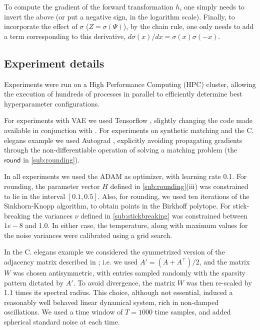 \documentclass[twoside]{article}
\begin{document}
To compute the gradient of the forward transformation $h$, one simply needs to invert the above (or put a negative sign, in the logarithm scale). Finally,  to incorporate the effect of $\sigma$ ($Z=\sigma(\Psi)$), by the chain rule,  one only needs to add a term corresponding to this derivative, $d\sigma(x)/dx=\sigma(x)\sigma(-x)$. 
\subsection*{Experiment details}

Experiments were run on a High Performance Computing (HPC) cluster, allowing the execution of hundreds of processes in parallel to efficiently determine best hyperparameter configurations.

For experiments with VAE we used Tensorflow \citep{Abadi2016}, slightly changing the code made available in conjunction with \cite{jang2016categorical}. For experiments on synthetic matching and the C. elegans example we used Autograd  \citep{maclaurin2015autograd}, explicitly avoiding propagating gradients through the non-differentiable operation of solving a matching problem (the $\mathsf{round}$ in \ref{sub:rounding}).

In all experiments we used the ADAM as optimizer, with learning rate 0.1. For rounding, the parameter vector $H$ defined in \ref{sub:rounding}(iii) was constrained to lie in the interval $[0.1, 0.5]$. Also, for rounding, we used ten iterations of the Sinkhorn-Knopp algorithm, to obtain points in the Birkhoff polytope. For stick-breaking the variances $\nu$ defined in \ref{sub:stickbreaking} was constrained between $1e-8$ and 1.0. In either case, the temperature, along with maximum values for the noise variances were calibrated using a grid search.
 
In the C. elegans example we considered the symmetrized version of the adjacency matrix described in \citep{varshney2011structural}; i.e. we used $A'=(A+A^\top)/2$, and the matrix $W$ was chosen antisymmetric, with entries sampled randomly with the sparsity pattern dictated by $A'$. To avoid divergence, the matrix $W$ was then re-scaled by 1.1 times its spectral radius. This choice, although not essential, induced a reasonably well behaved linear dynamical system, rich in non-damped oscillations. We used a time window of $T=1000$ time samples, and added spherical standard noise at each time. 




\end{document}
